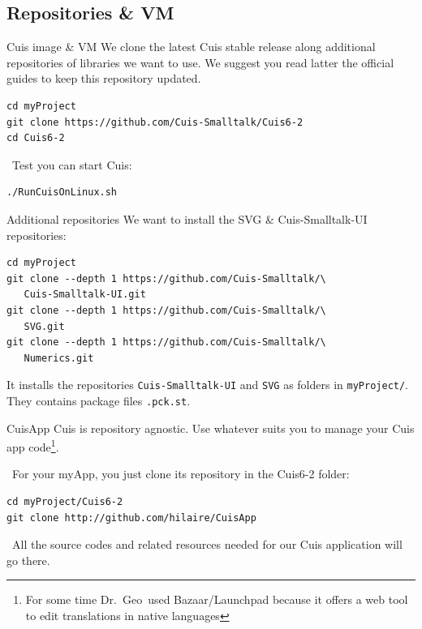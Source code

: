 \documentclass{beamer}
\newcommand{\tip}{\boldmath{\textcolor{red}{$\Rightarrow$}}}
\newcommand{\drgeo}{Dr.~Geo}
\begin{document}
\subsection{Repositories \& VM}
\begin{frame}[fragile]{Cuis image \& VM}
  We clone the latest Cuis stable release along additional
  repositories of libraries we want to use. We suggest you read latter
  the official guides to keep this repository updated\cite{cuisRepo}.

\begin{verbatim}
cd myProject
git clone https://github.com/Cuis-Smalltalk/Cuis6-2
cd Cuis6-2
\end{verbatim}
%
\tip\ Test you can start Cuis:
\begin{verbatim}
./RunCuisOnLinux.sh
\end{verbatim}
\end{frame}
%
\begin{frame}[fragile]{Additional repositories}
  We want to install the SVG \& Cuis-Smalltalk-UI repositories:
\begin{verbatim}
cd myProject
git clone --depth 1 https://github.com/Cuis-Smalltalk/\
   Cuis-Smalltalk-UI.git
git clone --depth 1 https://github.com/Cuis-Smalltalk/\
   SVG.git
git clone --depth 1 https://github.com/Cuis-Smalltalk/\
   Numerics.git
\end{verbatim}

  It installs the repositories \texttt{Cuis-Smalltalk-UI} and
  \texttt{SVG} as folders in \texttt{myProject/}. They contains
  package files \texttt{.pck.st}.
  
\end{frame}
%
\begin{frame}[fragile]{CuisApp}
  Cuis is repository agnostic. Use whatever suits you to manage your
  Cuis app code\footnote[frame]{ For some time \drgeo\ used
    Bazaar/Launchpad because it offers a web tool to edit translations
    in native languages\cite{drgeoRepo}}.

  \tip\ For your \alert{myApp}, you just clone its repository in the
  Cuis6-2 folder:

\begin{verbatim}
cd myProject/Cuis6-2
git clone http://github.com/hilaire/CuisApp
\end{verbatim}

  \tip\ All the source codes and related resources needed for our Cuis
  application will go there.
  
\end{frame}
\end{document}
